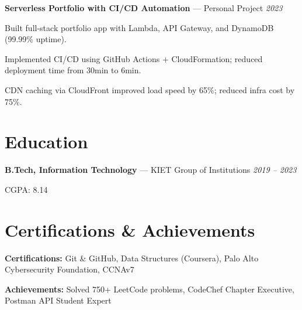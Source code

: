 \documentclass[letterpaper,10pt]{article}
\newcommand{\jobHeading}[3]{
  \noindent\textbf{#1} — #2 \hfill \textit{#3} \\
}
\newenvironment{resume_list}{
  \vspace{-6pt}
  \begin{itemize}[itemsep=2pt, leftmargin=18pt]
}{\end{itemize}}
\begin{document}
\jobHeading{Serverless Portfolio with CI/CD Automation}{Personal Project}{2023}
\begin{resume_list}
  \item Built full-stack portfolio app with Lambda, API Gateway, and DynamoDB (99.99\% uptime).
  \item Implemented CI/CD using GitHub Actions + CloudFormation; reduced deployment time from 30min to 6min.
  \item CDN caching via CloudFront improved load speed by 65\%; reduced infra cost by 75\%.
\end{resume_list}

\section{Education}
\jobHeading{B.Tech, Information Technology}{KIET Group of Institutions}{2019 – 2023}
\begin{resume_list}
  \item CGPA: 8.14
\end{resume_list}

\section{Certifications \& Achievements}
\begin{resume_list}
  \item \textbf{Certifications:} Git \& GitHub, Data Structures (Coursera), Palo Alto Cybersecurity Foundation, CCNAv7
  \item \textbf{Achievements:} Solved 750+ LeetCode problems, CodeChef Chapter Executive, Postman API Student Expert
\end{resume_list}
\end{document}
